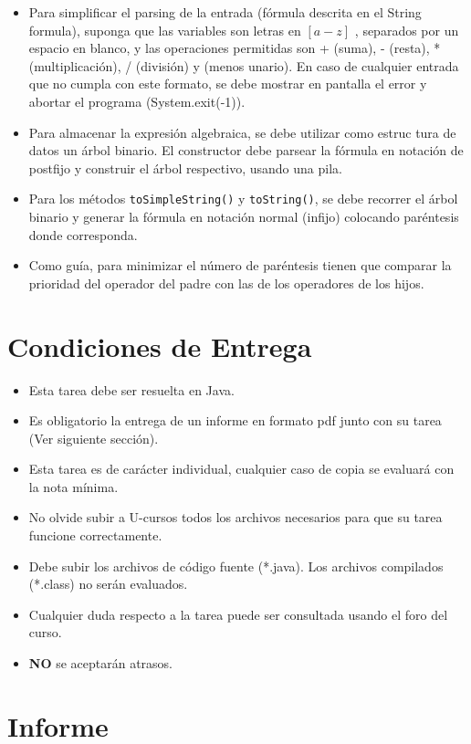 \documentclass[dcc]{fcfmcourse}
\begin{document}
\begin{itemize}
\item Para simplificar el parsing de la entrada (fórmula descrita en el String formula), suponga que las variables son letras en $\left[a-z\right]$ , separados por un espacio en blanco, y las operaciones permitidas son + (suma), - (resta), * (multiplicación), / (división) y (menos unario). En caso de cualquier entrada que no cumpla con este formato, se debe mostrar en pantalla el error y abortar el programa (System.exit(-1)).
\item Para almacenar la expresión algebraica, se debe utilizar como estruc tura de datos un árbol binario. El constructor debe parsear la fórmula en notación de postfijo y construir el  árbol respectivo, usando una pila.
\item Para los métodos \texttt{toSimpleString()} y \texttt{toString()}, se debe recorrer el  árbol binario y generar la fórmula en notación normal (infijo) colocando paréntesis donde corresponda.
\item Como guía, para minimizar el número de paréntesis tienen que comparar la prioridad del operador del padre
con las de los operadores de los hijos. 
\end{itemize}

\section{Condiciones de Entrega}

\begin{itemize}
    \item Esta tarea debe ser resuelta en Java.
    \item Es obligatorio la entrega de un informe en formato pdf junto con su tarea (Ver siguiente sección).
    \item Esta tarea es de carácter individual, cualquier caso de copia se evaluará con la nota mínima.
    \item No olvide subir a U-cursos todos los archivos necesarios para que su tarea funcione correctamente.
    \item Debe subir los archivos de código fuente (*.java). Los archivos compilados (*.class) no serán evaluados.
    \item Cualquier duda respecto a la tarea puede ser consultada usando el foro del curso.
    \item \textbf{NO} se aceptarán atrasos.
\end{itemize}

\section{Informe}
\end{document}
